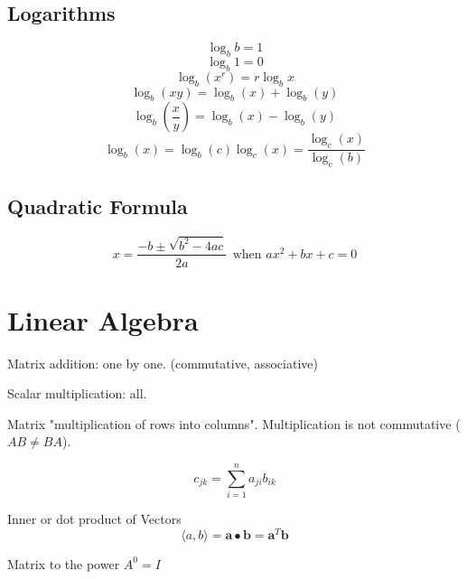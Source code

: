 \documentclass{article}
\begin{document}
	\subsection{Logarithms}	
		\begin{equation}
			\log _b b = 1
		\end{equation}
		\begin{equation}
			\log _b 1 = 0
		\end{equation}
		\begin{equation}
			\log _b (x^r) = r \log _b x
		\end{equation}
		\begin{equation}
			\log _b (xy) = \log _b (x) + \log _b (y)
		\end{equation}
		\begin{equation}
			\log _b \left( \frac{x}{y} \right) = \log _b (x) - \log _b (y)
		\end{equation}
		\begin{equation}
			\log _b \left( x \right) = \log _b \left( c \right)\log _c \left( x \right) = \frac{{\log _c \left( x \right)}}{{\log _c \left( b \right)}}
		\end{equation}
	\subsection{Quadratic Formula}
		\begin{equation}
			x = \frac{{ - b \pm \sqrt {b^2 - 4ac} }}{{2a}} \ \ \mbox{when $ax^2 + bx + c = 0$}
		\end{equation}
\section{Linear Algebra}
	Matrix addition: one by one. (commutative, associative)
	
	Scalar multiplication: all. 

	Matrix "multiplication of rows into columns". Multiplication is not commutative ($AB\neq BA$).
	
	\begin{equation}
		c_{jk} = \sum_{i=1}^{n} a_{ji}b_{ik}
	\end{equation}
	
	Inner or dot product of Vectors
	\begin{equation}
		\langle a,b \rangle = \mathbf{a} \bullet \mathbf{b} = \textbf{a}^T\mathbf{b} 
	\end{equation}

	Matrix to the power $A^0=I$
\end{document}
